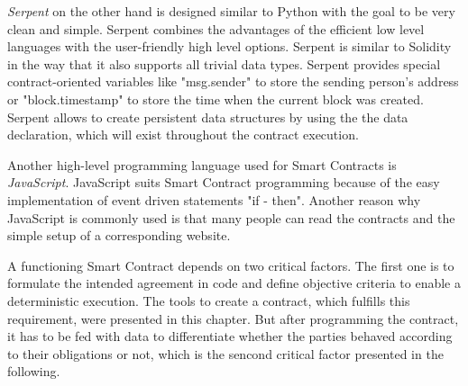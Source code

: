 \documentclass[conference]{IEEEtran}
\begin{document}
\textit{Serpent} on the other hand is designed similar to Python with the goal to be very clean and simple. Serpent combines the advantages of the efficient low level languages with the user-friendly high level options. Serpent is similar to Solidity in the way that it also supports all trivial data types. Serpent provides special contract-oriented variables like "msg.sender" to store the sending person's address or "block.timestamp" to store the time when the current block was created. Serpent allows to create persistent data structures by using the the data declaration, which will exist throughout the contract execution. \cite{McAdams2017} \cite{Arnett2015} \par 
Another high-level programming language used for Smart Contracts is \textit{JavaScript}. JavaScript suits Smart Contract programming because of the easy implementation of event driven statements "if - then". Another reason why JavaScript is commonly used is that many people can read the contracts and the simple setup of a corresponding website. \cite{bitquant2016} \par 
A functioning Smart Contract depends on two critical factors. The first one is to formulate the intended agreement in code and define objective criteria to enable a deterministic execution. The tools to create a contract, which fulfills this requirement, were presented in this chapter. But after programming the contract, it has to be fed with data to differentiate whether the parties behaved according to their obligations or not, which is the sencond critical factor presented in the following. 
\end{document}
